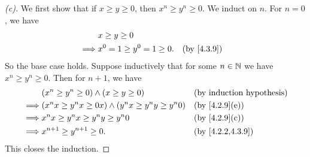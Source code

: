 \begin{proof}[(c)]
  We first show that if \(x \geq y \geq 0\), then \(x^n \geq y^n \geq 0\).
  We induct on \(n\).
  For \(n = 0\), we have
  \begin{align*}
             & x \geq y \geq 0                              \\
    \implies & x^0 = 1 \geq y^0 = 1 \geq 0. &  & \by{4.3.9}
  \end{align*}
  So the base case holds.
  Suppose inductively that for some \(n \in \mathbb{N}\) we have \(x^n \geq y^n \geq 0\).
  Then for \(n + 1\), we have
  \begin{align*}
             & (x^n \geq y^n \geq 0) \land (x \geq y \geq 0)                  &  & \byIH            \\
    \implies & (x^n x \geq y^n x \geq 0x) \land (y^n x \geq y^n y \geq y^n 0) &  & \by{4.2.9}[e]    \\
    \implies & x^n x \geq y^n x \geq y^n y \geq y^n 0                         &  & \by{4.2.9}[c]    \\
    \implies & x^{n + 1} \geq y^{n + 1} \geq 0.                               &  & \by{4.2.2,4.3.9}
  \end{align*}
  This closes the induction.


\end{proof}
